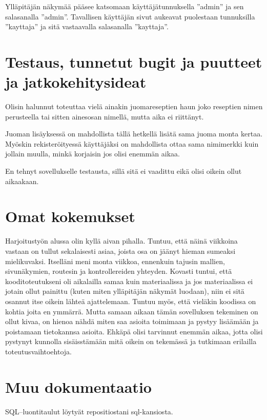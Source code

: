 \documentclass[a4paper]{article}
\begin{document}
Ylläpitäjän näkymää pääsee katsomaan käyttäjätunnuksella ”admin” ja sen salasanalla ”admin”. Tavallisen käyttäjän sivut aukeavat puolestaan tunnuksilla ”kayttaja” ja sitä vastaavalla salasanalla ”kayttaja”.

\section{Testaus, tunnetut bugit ja puutteet ja jatkokehitysideat}
Olisin halunnut toteuttaa vielä ainakin juomareseptien haun joko reseptien nimen perusteella tai sitten ainesosan nimellä, mutta aika ei riittänyt. 

Juoman lisäyksessä on mahdollista tällä hetkellä lisätä sama juoma monta kertaa. Myöskin rekisteröityessä käyttäjäksi on mahdollista ottaa sama nimimerkki kuin jollain muulla, minkä korjaisin jos olisi enemmän aikaa. 

En tehnyt sovellukselle testausta, sillä sitä ei vaadittu eikä olisi oikein ollut aikaakaan.

\section{Omat kokemukset}
Harjoitustyön alussa olin kyllä aivan pihalla. Tuntuu, että näinä viikkoina vastaan on tullut sekalaisesti asiaa, joista osa on jäänyt hieman sumeaksi mielikuvaksi. Itselläni meni monta viikkoa, ennenkuin tajusin mallien, sivunäkymien, routesin ja kontrollereiden yhteyden. Kovasti tuntui, että kooditoteutukseni oli aikalailla samaa kuin materiaalissa ja jos materiaalissa ei jotain ollut painittu (kuten miten ylläpitäjän näkymät luodaan), niin ei sitä osannut itse oikein lähteä ajattelemaan. Tuntuu myös, että vieläkin koodissa on kohtia joita en ymmärrä. Mutta samaan aikaan tämän sovelluksen tekeminen on ollut kivaa, on hienoa nähdä miten saa asioita toimimaan ja pystyy lisäämään ja poistamaan tietokannsa asioita. Ehkäpä olisi tarvinnut enemmän aikaa, jotta olisi pystynyt kunnolla sisäisstämään mitä oikein on tekemässä ja tutkimaan erilailla toteutusvaihtoehtoja.

\section{Muu dokumentaatio}

SQL--luontitaulut löytyät repositiostani sql-kansiosta.
\end{document}
